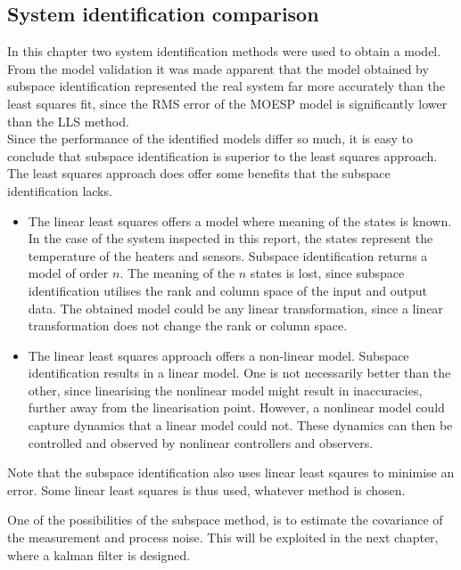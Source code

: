 \subsection{System identification comparison}
In this chapter two system identification methods were used to obtain a model. From the model validation it was made apparent that the model obtained by subspace identification represented the real system far more accurately than the least squares fit, since the RMS error of the MOESP model is significantly lower than the LLS method.\\
Since the performance of the identified models differ so much, it is easy to conclude that subspace identification is superior to the least squares approach. The least squares approach does offer some benefits that the subspace identification lacks.
\begin{itemize}
    \item The linear least squares offers a model where meaning of the states is known. In the case of the system inspected in this report, the states represent the temperature of the heaters and sensors. Subspace identification returns a model of order $n$. The meaning of the $n$ states is lost, since subspace identification utilises the rank and column space of the input and output data. The obtained model could be any linear transformation, since a linear transformation does not change the rank or column space.
    \item The linear least squares approach offers a non-linear model. Subspace identification results in a linear model. One is not necessarily better than the other, since linearising the nonlinear model might result in inaccuracies, further away from the linearisation point. However, a nonlinear model could capture dynamics that a linear model could not. These dynamics can then be controlled and observed by nonlinear controllers and observers.
\end{itemize}
Note that the subspace identification also uses linear least sqaures to minimise an error. Some linear least squares is thus used, whatever method is chosen.

One of the possibilities of the subspace method, is to estimate the covariance of the measurement and process noise. This will be exploited in the next chapter, where a kalman filter is designed.